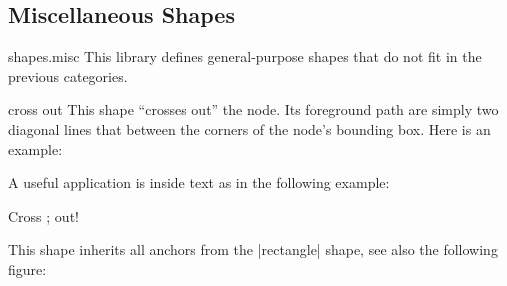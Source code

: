\subsection{Miscellaneous Shapes}

\begin{pgflibrary}{shapes.misc}
  This library defines general-purpose shapes that do not fit in the
  previous categories.
\end{pgflibrary}

\begin{shape}{cross out}
  This shape ``crosses out'' the node. Its foreground path are simply
  two diagonal lines that between the corners of the node's bounding
  box. Here is an example:  
\begin{codeexample}[]
\end{codeexample}

  A useful application is inside text as in the following example:
\begin{codeexample}[]
Cross \tikz[baseline] ; out!  
\end{codeexample}

  This shape inherits all anchors from the |rectangle| shape, see also
  the following figure:
\begin{codeexample}[]
\Huge
{}
\end{codeexample}
\end{shape}


